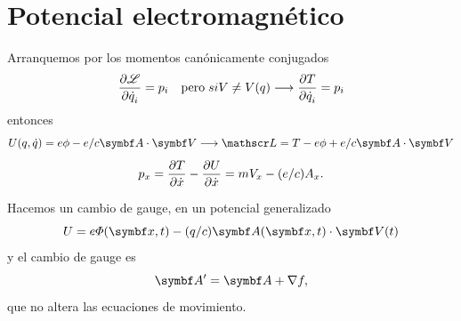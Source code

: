 \documentclass[10pt,oneside]{CBFT_book}
\begin{document}
\section{Potencial electromagnético}

Arranquemos por los momentos canónicamente conjugados
\[
	\frac{\partial^{\hspace{-0.05em}} {\mathscr{L}}}{\partial {\dot{q}_i}^{\hspace{-0.05em}}} = p_i \quad \textrm{pero} \; si V \neq V(q) \longrightarrow \frac{\partial^{\hspace{-0.05em}} {T}}{\partial {\dot{q}_i}^{\hspace{-0.05em}}} = p_i
\]
entonces
\[
	U(q,\dot{q}) =  e \phi - e/c \vb{A}\cdot\vb{V} \longrightarrow \Lag = T - e \phi + e/c  \vb{A}\cdot\vb{V}
\]
\[
	p_x = \frac{\partial^{\hspace{-0.05em}} {T}}{\partial {\dot{x}}^{\hspace{-0.05em}}} - \frac{\partial^{\hspace{-0.05em}} {U}}{\partial {\dot{x}}^{\hspace{-0.05em}}} = m V_x - (e/c) A_x.
\]

Hacemos un cambio de gauge, en un potencial generalizado
\[
	U =  e \Phi(\vb{x},t) - (q/c) \vb{A}(\vb{x},t)\cdot\vb{V}(t)
\]
y el cambio de gauge es
\[
	\vb{A}' = \vb{A} + \nabla f,
\]
que no altera las ecuaciones de movimiento.
\end{document}
